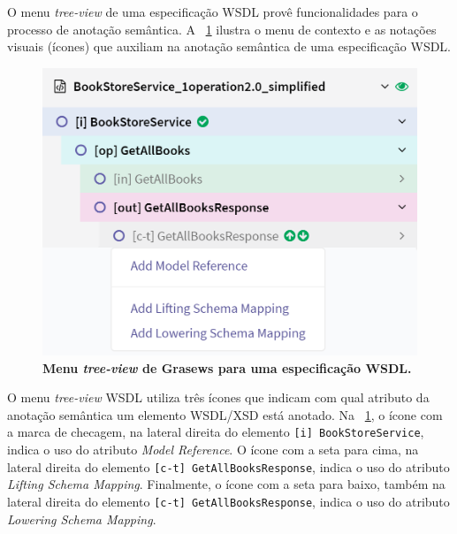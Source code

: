 O menu \textit{tree-view} de uma especificação WSDL provê funcionalidades para o processo de anotação semântica. A \figurename~\ref{fig:grasews-menu-tree-view-icones-anotacao} ilustra o menu de contexto e as notações visuais (ícones) que auxiliam na anotação semântica de uma especificação WSDL.

\begin{figure}[h]
    \includegraphics[scale=0.4]{4-grasews/imagens/grasews-menu-tree-view-icones-anotacao.png}
    \centering
    \caption[Menu \textit{tree-view} de Grasews para uma especificação WSDL]{\textbf{Menu \textit{tree-view} de Grasews para uma especificação WSDL.}}
    \label{fig:grasews-menu-tree-view-icones-anotacao}
\end{figure}

O menu \textit{tree-view} WSDL utiliza três ícones que indicam com qual atributo da anotação semântica um elemento WSDL/XSD está anotado. Na \figurename~\ref{fig:grasews-menu-tree-view-icones-anotacao}, o ícone com a marca de checagem, na lateral direita do elemento \texttt{[i] BookStoreService}, indica o uso do atributo \textit{Model Reference}. O ícone com a seta para cima, na lateral direita do elemento \texttt{[c-t] GetAllBooksResponse}, indica o uso do atributo \textit{Lifting Schema Mapping}. Finalmente, o ícone com a seta para baixo, também na lateral direita do elemento \texttt{[c-t] GetAllBooksResponse}, indica o uso do atributo \textit{Lowering Schema Mapping}.

